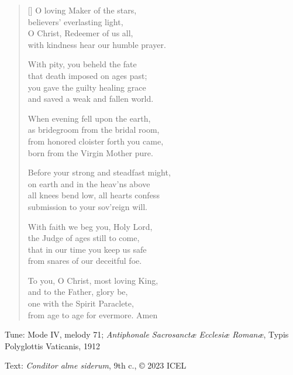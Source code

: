 \hymn

\settowidth{\versewidth}{Before your strong and steadfast might,}

\begin{verse}[\versewidth]
O loving Maker of the stars,\\
believers’ everlasting light,\\
O Christ, Redeemer of us all,\\
with kindness hear our humble prayer.

With pity, you beheld the fate\\
that death imposed on ages past;\\
you gave the guilty healing grace\\
and saved a weak and fallen world.

When evening fell upon the earth,\\
as bridegroom from the bridal room,\\
from honored cloister forth you came,\\
born from the Virgin Mother pure.

Before your strong and steadfast might,\\
on earth and in the heav’ns above\\
all knees bend low, all hearts confess\\
submission to your sov’reign will.

With faith we beg you, Holy Lord,\\
the Judge of ages still to come,\\
that in our time you keep us safe\\
from snares of our deceitful foe.

To you, O Christ, most loving King,\\
and to the Father, glory be,\\
one with the Spirit Paraclete,\\
from age to age for evermore. Amen
\end{verse}

\begin{hymnsource}
Tune: Mode IV, melody 71; \emph{Antiphonale Sacrosanctæ Ecclesiæ Romanæ}, Typis Polyglottis Vaticanis, 1912

Text: \emph{Conditor alme siderum}, 9th c., © 2023 ICEL
\end{hymnsource}